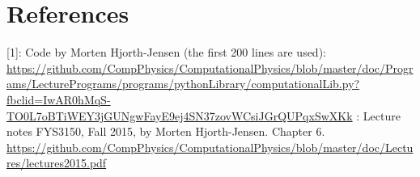 \documentclass[english,a4paper, 11pt]{article}
\begin{document}
\section{References}
 
[1]:
Code by Morten Hjorth-Jensen (the first 200 lines are used):
\newline
\url{https://github.com/CompPhysics/ComputationalPhysics/blob/master/doc/Programs/LecturePrograms/programs/pythonLibrary/computationalLib.py?fbclid=IwAR0hMqS-TO0L7oBTiWEY3jGUNgwFayE9ej4SN37zovWCsiJGrQUPqxSwXKk}
\newline
\newline
[2]: Lecture notes FYS3150, Fall 2015, by Morten Hjorth-Jensen. Chapter 6.
\newline
\url{https://github.com/CompPhysics/ComputationalPhysics/blob/master/doc/Lectures/lectures2015.pdf}
\end{document}
